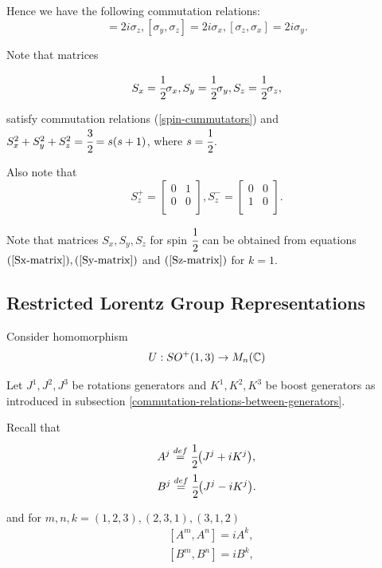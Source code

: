 \documentclass[main.tex]{subfiles}
\begin{document}
Hence we have the following commutation relations:
\begin{equation}
[\sigma_x, \sigma_y] = 2i\sigma_z, [\sigma_y, \sigma_z] = 2i\sigma_x, [\sigma_z, \sigma_x] = 2i\sigma_y.
\end{equation}

Note that matrices

\begin{equation}
S_x = \cfrac{1}{2}\sigma_x, S_y = \cfrac{1}{2}\sigma_y, S_z = \cfrac{1}{2}\sigma_z,
\end{equation}

satisfy commutation relations (\ref{spin-cummutators}) and $S^2_x + S^2_y + S^2_z = \cfrac{3}{2} = s(s + 1)$, where $s=\cfrac{1}{2}$.


Also note that
\begin{equation}
S^{+}_z = \begin{bmatrix}
    0 &  1 \\
    0 & 0 \\
\end{bmatrix},
S^{-}_z = \begin{bmatrix}
    0 &  0 \\
    1 & 0 \\
\end{bmatrix}.
\end{equation}

Note that matrices $S_x, S_y, S_z$ for spin $\cfrac{1}{2}$ can be obtained from equations $(\ref{Sx-matrix}), (\ref{Sy-matrix})$ and $(\ref{Sz-matrix})$ for $k = 1$.

\subsection{Restricted Lorentz Group Representations}

Consider homomorphism 
\begin{equation}
U: SO^{+}(1, 3)\to M_n(\mathbb{C})
\end{equation}

Let $J^1, J^2, J^3$ be rotations generators and $K^1, K^2, K^3$ be boost generators as introduced in subsection \ref{commutation-relations-between-generators}.

Recall that
\begin{align*}
& A^j \stackrel{def}{=} \cfrac{1}{2}\big(J^j + iK^j\big),\\
& B^j \stackrel{def}{=} \cfrac{1}{2}\big(J^j - iK^j\big).
\end{align*}

and
for $m, n, k = (1, 2, 3), (2, 3, 1), (3, 1, 2)$
\begin{align*}
& [A^m, A^n] = iA^k, \\
& [B^m, B^n] = iB^k,
\end{align*} 
\end{document}

